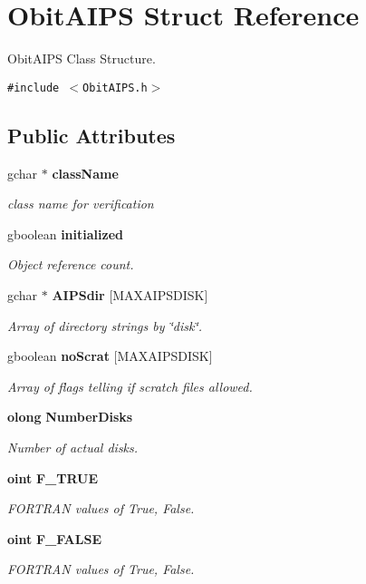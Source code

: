 \section{Obit\-AIPS Struct Reference}
\label{structObitAIPS}
Obit\-AIPS Class Structure.  


{\tt \#include $<$Obit\-AIPS.h$>$}

\subsection*{Public Attributes}
\begin{CompactItemize}
\item 
gchar $\ast$ {\bf class\-Name}
\begin{CompactList}\small\item\em class name for verification \item\end{CompactList}\item 
gboolean {\bf initialized}
\begin{CompactList}\small\item\em Object reference count. \item\end{CompactList}\item 
gchar $\ast$ {\bf AIPSdir} [MAXAIPSDISK]
\begin{CompactList}\small\item\em Array of directory strings by \char`\"{}disk\char`\"{}. \item\end{CompactList}\item 
gboolean {\bf no\-Scrat} [MAXAIPSDISK]
\begin{CompactList}\small\item\em Array of flags telling if scratch files allowed. \item\end{CompactList}\item 
{\bf olong} {\bf Number\-Disks}
\begin{CompactList}\small\item\em Number of actual disks. \item\end{CompactList}\item 
{\bf oint} {\bf F\_\-TRUE}
\begin{CompactList}\small\item\em FORTRAN values of True, False. \item\end{CompactList}\item 
{\bf oint} {\bf F\_\-FALSE}
\begin{CompactList}\small\item\em FORTRAN values of True, False. \item\end{CompactList}\end{CompactItemize}


